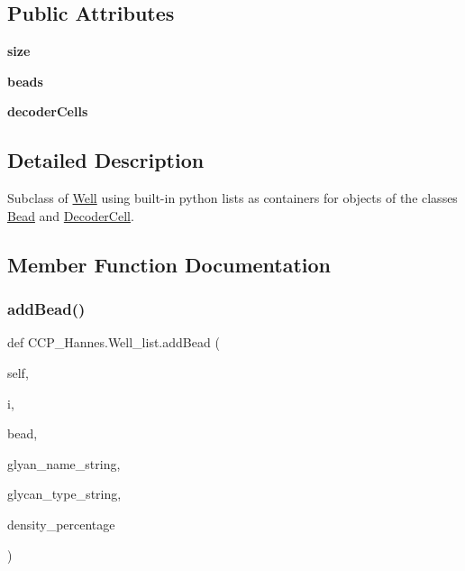 \subsection*{Public Attributes}
\begin{DoxyCompactItemize}
\item 
\mbox{\label{class_c_c_p___hannes_1_1_well__list_a676c83197aea581b7a130d3e126bdca8}} 
{\bfseries size}
\item 
\mbox{\label{class_c_c_p___hannes_1_1_well__list_a98e8a5739d0543e714fb0328d1ebeee9}} 
{\bfseries beads}
\item 
\mbox{\label{class_c_c_p___hannes_1_1_well__list_a2565b636a8563902152fbca021c0b84e}} 
{\bfseries decoder\+Cells}
\end{DoxyCompactItemize}


\subsection{Detailed Description}
Subclass of \mbox{\hyperlink{class_c_c_p___hannes_1_1_well}{Well}} using built-\/in python lists as containers for objects of the classes \mbox{\hyperlink{class_c_c_p___hannes_1_1_bead}{Bead}} and \mbox{\hyperlink{class_c_c_p___hannes_1_1_decoder_cell}{Decoder\+Cell}}. 

\subsection{Member Function Documentation}
\mbox{\label{class_c_c_p___hannes_1_1_well__list_ae4a512caba0dd7137b6ad4196cf72c1d}} 
\subsubsection{\texorpdfstring{add\+Bead()}{addBead()}}
{\footnotesize\ttfamily def C\+C\+P\+\_\+\+Hannes.\+Well\+\_\+list.\+add\+Bead (\begin{DoxyParamCaption}\item[{}]{self,  }\item[{}]{i,  }\item[{}]{bead,  }\item[{}]{glyan\+\_\+name\+\_\+string,  }\item[{}]{glycan\+\_\+type\+\_\+string,  }\item[{}]{density\+\_\+percentage }\end{DoxyParamCaption})}



